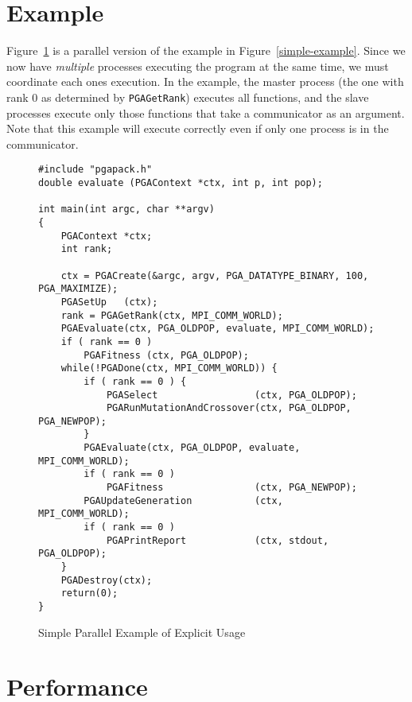 \documentclass{report}
\begin{document}
\section{Example}\label{sec:par-example}

Figure~\ref{simple-parexample} is a parallel version of the example in
Figure~\ref{simple-example}.  Since we now have {\em multiple} processes
executing the program at the same time, we must coordinate each ones
execution.  In the example, the master process (the one with rank 0 as
determined by {\tt PGAGetRank}) executes all functions, and the slave
processes execute only those functions that take a communicator as an
argument.  Note that this example will execute correctly even if only one
process is in the communicator.

\begin{figure}
\begin{verbatim}
#include "pgapack.h"
double evaluate (PGAContext *ctx, int p, int pop);

int main(int argc, char **argv)
{
    PGAContext *ctx;
    int rank;

    ctx = PGACreate(&argc, argv, PGA_DATATYPE_BINARY, 100, PGA_MAXIMIZE);
    PGASetUp   (ctx);
    rank = PGAGetRank(ctx, MPI_COMM_WORLD);
    PGAEvaluate(ctx, PGA_OLDPOP, evaluate, MPI_COMM_WORLD);
    if ( rank == 0 )
        PGAFitness (ctx, PGA_OLDPOP);
    while(!PGADone(ctx, MPI_COMM_WORLD)) {
        if ( rank == 0 ) {
            PGASelect                 (ctx, PGA_OLDPOP);
            PGARunMutationAndCrossover(ctx, PGA_OLDPOP, PGA_NEWPOP);
        }
        PGAEvaluate(ctx, PGA_OLDPOP, evaluate, MPI_COMM_WORLD);
        if ( rank == 0 )
            PGAFitness                (ctx, PGA_NEWPOP);
        PGAUpdateGeneration           (ctx, MPI_COMM_WORLD);
        if ( rank == 0 )
            PGAPrintReport            (ctx, stdout, PGA_OLDPOP);
    }
    PGADestroy(ctx);
    return(0);
}
\end{verbatim}
\caption{Simple Parallel Example of Explicit Usage}
\label{simple-parexample}
\end{figure}



\section{Performance}\label{sec:par-performance}
\end{document}
